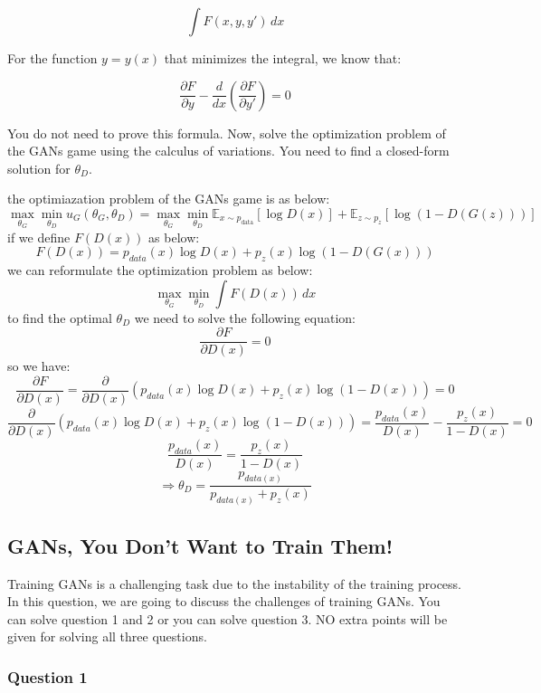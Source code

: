 \[
\int F(x, y, y') \, dx
\]

For the function $y = y(x)$ that minimizes the integral, we know that:

\[
\frac{\partial F}{\partial y} - \frac{d}{dx} \left( \frac{\partial F}{\partial y'} \right) = 0
\]

You do not need to prove this formula. Now, solve the optimization problem of the GANs game using the calculus of variations. You need to find a closed-form solution for $\theta_D$.
\begin{qsolve}
    \begin{qsolve}[]
        the optimiazation problem of the GANs game is as below:
        \[
        \max_{\theta_G} \min_{\theta_D} u_G(\theta_G, \theta_D) = \max_{\theta_G} \min_{\theta_D} \mathbb{E}_{x \sim p_{\text{data}}} [\log D(x)] + \mathbb{E}_{z \sim p_z} [\log (1 - D(G(z)))]
        \]
        if we define $F(D(x))$ as below:
        \[
            F(D(x)) = p_{data}(x) \log D(x) + p_z(x) \log (1 - D(G(x))) 
        \]
        we can reformulate the optimization problem as below:
        \[
           \max_{\theta_G} \min_{\theta_D} \int F(D(x)) \, dx
        \]
        \splitqsolve[\splitqsolve]
        to find the optimal $\theta_D$ we need to solve the following equation:
        \[
            \frac{\partial F}{\partial D(x)} = 0
        \]
        so we have:
        \[
            \frac{\partial F}{\partial D(x)} = \frac{\partial}{\partial D(x)} (p_{data}(x) \log D(x) + p_z(x) \log (1 - D(x))) = 0
        \]
        \[
            \frac{\partial}{\partial D(x)} (p_{data}(x) \log D(x) + p_z(x) \log (1 - D(x))) = \frac{p_{data}(x)}{D(x)} - \frac{p_z(x)}{1 - D(x)} = 0
        \]
        \[
            \frac{p_{data}(x)}{D(x)} = \frac{p_z(x)}{1 - D(x)}
        \]
        \[
            \Rightarrow \theta_D = \frac{p_{data(x)}}{p_{data(x)} +p_z(x)}
        \]
    \end{qsolve}
\end{qsolve}
\subsection{GANs, You Don’t Want to Train Them!}

Training GANs is a challenging task due to the instability of the training process. In this question, we are going to discuss the challenges of training GANs. You can solve question 1 and 2 or you can solve question 3. NO extra points will be given for solving all three questions.

\subsubsection{Question 1}

